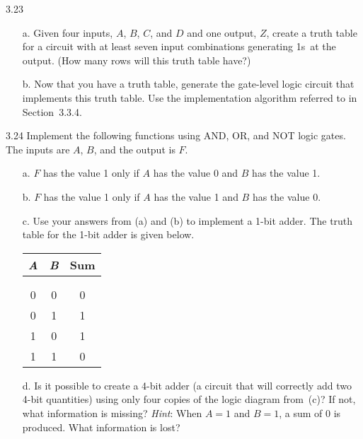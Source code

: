 \documentclass{patt}
\begin{document}
\begin{exercises}
\item[3.23]
\begin{enumerate}
\item[a.] Given four inputs, $A$, $B$, $C$, and $D$ and one output,
  $Z$, create a truth table for a circuit with at least seven input
  combinations generating 1s~at the output. (How many rows will this
  truth table have?)

\item[b.]  Now that you have a truth table, generate the gate-level
  logic circuit that implements this truth table. Use the
  implementation algorithm referred to in Section~3.3.4.
\end{enumerate}

\newpage

\item[3.24] Implement the following functions using AND, OR, and NOT
  logic gates. The inputs are $A$, $B$, and the output is $F$.

\begin{enumerate}
\item[a.] $F$ has the value 1 only if $A$ has the value 0 and $B$ has
  the value 1.
\item[b.] $F$ has the value 1 only if $A$ has the value 1 and $B$ has
  the value 0.
\item[c.] Use your answers from (a) and (b) to implement a 1-bit
  adder.\break
  The truth table for the 1-bit adder is given below.

\smallskip

\begin{inlinetable}
\tabcolsep=12pt
\begin{tabular}{@{}cc|c}\hline
{\em A} & {\em B} & \rule{0pt}{10pt}{Sum}\rule{0pt}{10pt}\\ \hline\\[-10.6pt]
& & \rule{0pt}{1pt}\\[-6.7pt]
 0 & 0 & 0 \\[2.6pt]
 0 & 1 & 1 \\[2.6pt]
 1 & 0 & 1 \\[2.6pt]
 1 & 1 & 0 \\\hline
\end{tabular}
\end{inlinetable}

\smallskip

\item[d.] Is it possible to create a 4-bit adder (a circuit that
  will correctly add two 4-bit quantities) using only four copies of
  the logic diagram from~(c)?  If not, what information is missing?
  {\em Hint}: When $A=1$\break
  and $B=1$, a sum of 0 is produced. What information is lost?
\end{enumerate}


\end{exercises}
\end{document}
